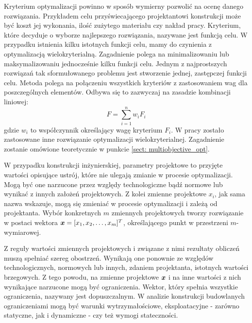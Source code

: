 Kryterium optymalizacji powinno w sposób wymierny pozwolić na ocenę danego rozwiązania. Przykładem celu przyświecającego projektantowi konstrukcji może być koszt jej wykonania, ilość zużytego materiału czy nakład pracy. Kryterium, które decyduje o wyborze najlepszego rozwiązania, nazywane jest funkcją celu. W przypadku istnienia kilku istotnych funkcji celu, mamy do czynienia z optymalizacją wielokryterialną. Zagadnienie polega na minimalizowaniu lub maksymalizowaniu jednocześnie kilku funkcji celu. Jednym z najprostszych rozwiązań tak sformułowanego problemu jest stworzenie jednej, zastępczej funkcji celu. Metoda polega na połączeniu wszystkich kryteriów z zastosowaniem wag dla poszczególnych elementów. Odbywa się to zazwyczaj na zasadzie kombinacji liniowej:
\begin{equation}
	F=\sum_{i=1}^{n}w_i F_i
\end{equation}
gdzie $w_i$ to współczynnik określający wagę kryterium $F_i$. W pracy zostało zastosowane inne rozwiązanie optymalizacji wielokryterialnej. Zagadnienie zostanie omówione teoretycznie w punkcie \ref{sect: multiobjective_opt}. 

W przypadku konstrukcji inżynierskiej, parametry projektowe to przyjęte wartości opisujące ustrój, które nie ulegają zmianie w procesie optymalizacji.  Mogą być one narzucone przez względy technologiczne bądź normowe \parencite{Szymczak1995} lub wynikać z innych założeń projektowych. Z kolei zmienne projektowe $x_i$, jak sama nazwa wskazuje, mogą się zmieniać w procesie optymalizacji i zależą od projektanta. Wybór konkretnych $m$ zmiennych projektowych tworzy rozwiązanie w postaci wektora $\bm{x}=[x_1,x_2,\dots,x_m]^T$, określającego punkt w przestrzeni $m$-wymiarowej.

Z reguły wartości zmiennych projektowych i związane z nimi rezultaty obliczeń muszą spełniać szereg obostrzeń. Wynikają one ponownie ze względów technologicznych, normowych lub innych, zdaniem projektanta, istotnych wartości brzegowych. Z tego powodu, na zmienne projektowe $\bm{x}$ i na inne wartości z nich wynikające narzucone mogą być ograniczenia. Wektor, który spełnia wszystkie ograniczenia, nazywany jest dopuszczalnym. W analizie konstrukcji budowlanych ograniczeniami mogą być warunki wytrzymałościowe, eksploatacyjne - zarówno statyczne, jak i dynamiczne - czy też wymogi stateczności.


